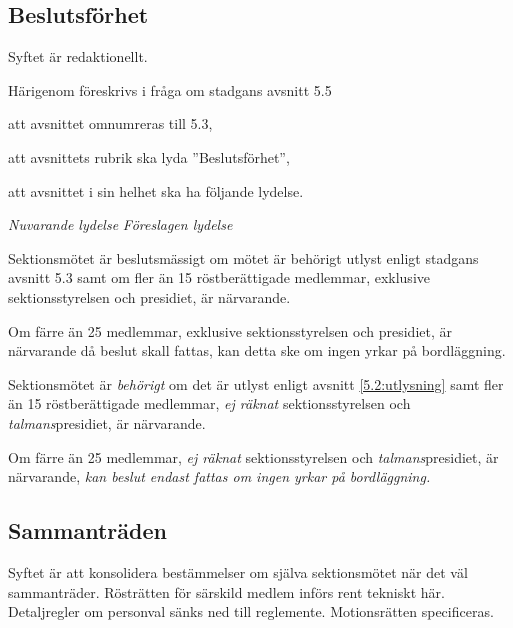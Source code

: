 \documentclass{article}
\newenvironment{lydelse}
    {\begin{paracol}{2}%
        \emph{Nuvarande lydelse}%
        \switchcolumn%
        \emph{Föreslagen lydelse}%
    \end{paracol}%
    \begin{enumerate}[label=\thesubsection.\arabic*]%
    \begin{paracol}{2}%
    }{\end{paracol}\end{enumerate}}
\begin{document}
\setcounter{subsection}{2}
\subsection{Beslutsförhet}
Syftet är redaktionellt.

Härigenom föreskrivs i fråga om stadgans avsnitt 5.5
\begin{dels}
  \item att avsnittet omnumreras till 5.3,
  \item att avsnittets rubrik ska lyda ''Beslutsförhet'',
  \item att avsnittet i sin helhet ska ha följande lydelse.
\end{dels}

\begin{lydelse}
  \setcounter{subsection}{5}
  \item Sektionsmötet är beslutsmässigt om mötet är behörigt utlyst enligt stadgans avsnitt 5.3 samt om fler än 15 röstberättigade medlemmar, exklusive sektionsstyrelsen och presidiet, är närvarande.
  \item Om färre än 25 medlemmar, exklusive sektionsstyrelsen och presidiet, är närvarande då beslut skall fattas, kan detta ske om ingen yrkar på bordläggning.

\switchcolumn
  \setcounter{subsection}{3}
  \item Sektionsmötet är \emph{behörigt} om det är utlyst enligt avsnitt \ref{5.2:utlysning} samt fler än 15 röstberättigade medlemmar, \emph{ej räknat} sektionsstyrelsen och \emph{talmans}presidiet, är närvarande.
  \item Om färre än 25 medlemmar, \emph{ej räknat} sektionsstyrelsen och \emph{talmans}presidiet, är närvarande, \emph{kan beslut endast fattas om ingen yrkar på bordläggning.}
\end{lydelse}

\setcounter{subsection}{3}
\subsection{Sammanträden}
Syftet är att konsolidera bestämmelser om själva sektionsmötet när det väl sammanträder.
Rösträtten för särskild medlem införs rent tekniskt här.
Detaljregler om personval sänks ned till reglemente.
Motionsrätten specificeras.
\end{document}
